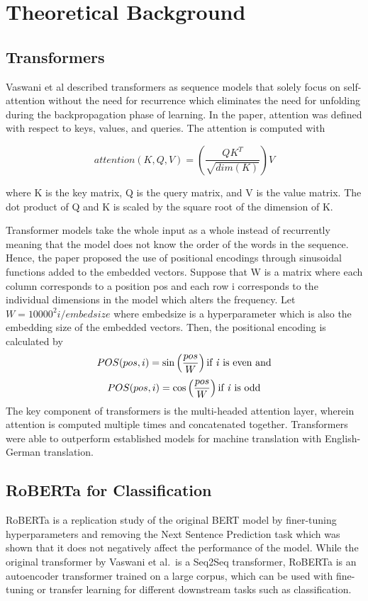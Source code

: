 \chapter{Theoretical Background}

\section{Transformers}

Vaswani et al\cite{vaswani2017attention} described transformers as sequence 
models that solely focus on self-attention without the need for recurrence which 
eliminates the need for unfolding during the backpropagation phase of learning. 
In the paper, attention was defined with respect to keys, values, and queries. 
The attention is computed with

\[ 
    attention(K,Q,V) = \left(\frac{QK^T}{\sqrt{dim(K)}}\right)V 
\]

where K is the key matrix, Q is the query matrix, and V is the value matrix. 
The dot product of Q and K is scaled by the square root of the dimension of K.

Transformer models take the whole input as a whole instead of recurrently meaning 
that the model does not know the order of the words in the sequence. Hence, the 
paper proposed the use of positional encodings through sinusoidal functions 
added to the embedded vectors. Suppose that W is a matrix where each column 
corresponds to a position pos and each row i corresponds to the individual 
dimensions in the model which alters the frequency. Let 
\begin{math}
    W=10000^2i/embedsize
\end{math}
where embedsize is a hyperparameter which is also the embedding size of the 
embedded vectors. Then, the positional encoding is calculated by
\[ 
    POS(pos,i) = \sin\left(\frac{pos}{W}\right) \text{if \textit{i} is even and}
\]
\[ 
    POS(pos,i) = \cos\left(\frac{pos}{W}\right) \text{if \textit{i} is odd}
\]
The key component of transformers is the multi-headed attention layer, wherein 
attention is computed multiple times and concatenated together. Transformers 
were able to outperform established models for machine translation with 
English-German translation.

\section{RoBERTa for Classification}
RoBERTa\cite{liu2019roberta} is a replication study of the original BERT 
model by finer-tuning hyperparameters and removing the Next Sentence 
Prediction task which was shown that it does not negatively affect the 
performance of the model. While the original transformer by Vaswani et al.\ 
is a Seq2Seq transformer, RoBERTa is an autoencoder transformer trained on a 
large corpus, which can be used with fine-tuning or transfer learning for 
different downstream tasks such as classification\cite{pritzkau2021nlytics}.


